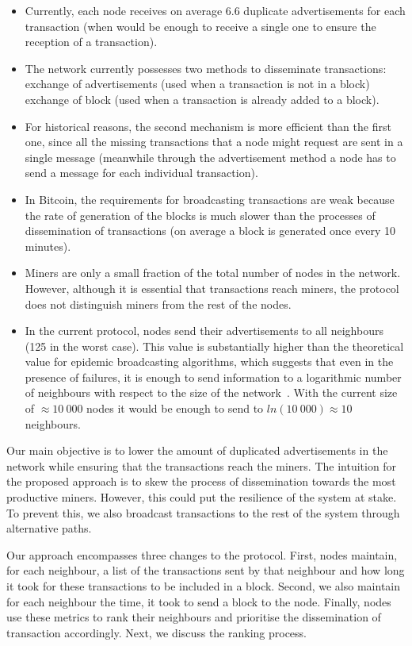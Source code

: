 \documentclass{dads}   %
\begin{document}
\begin{itemize}
  \item Currently, each node receives on average $6.6$ duplicate advertisements for each transaction (when would be enough to receive a single one to ensure the reception of a transaction).
  \item The network currently possesses two methods to disseminate transactions: exchange of advertisements (used when a transaction is not in a block) exchange of block (used when a transaction is already added to a block).
  \item For historical reasons, the second mechanism is more efficient than the first one, since all the missing transactions that a node might request are sent in a single message (meanwhile through the advertisement method a node has to send a message for each individual transaction).
  \item In Bitcoin, the requirements for broadcasting transactions are weak because the rate of generation of the blocks is much slower than the processes of dissemination of transactions (on average a block is generated once every 10 minutes).
  \item Miners are only a small fraction of the total number of nodes in the network. However, although it is essential that transactions reach miners, the protocol does not distinguish miners from the rest of the nodes.
  \item In the current protocol, nodes send their advertisements to all  neighbours (125 in the worst case). This value is substantially higher than the theoretical value for epidemic broadcasting algorithms, which suggests that even in the presence of failures, it is enough to send information to a logarithmic number of neighbours with respect to the size of the network~\cite{epidemicDiss}. With the current size of $\approx 10~000$ nodes  it would be enough to send to $ ln(10~000) \approx 10$ neighbours.
\end{itemize}

Our main objective is to lower the amount of duplicated advertisements in the network while ensuring that the transactions reach the miners. The intuition for the proposed approach is to skew the process of dissemination towards the most productive miners. However, this could put the resilience of the system at stake. To prevent this, we also broadcast transactions to the rest of the system through alternative paths. 

Our approach encompasses three changes to the protocol. 
First, nodes  maintain, for each neighbour, a list of the transactions sent by that neighbour and how long it took for these transactions to be included in a block.
Second, we also maintain for each neighbour the time, it took to send a block to the node.
Finally, nodes use these metrics to rank their neighbours and prioritise the dissemination of transaction accordingly.
Next, we discuss the ranking process.
\end{document}
